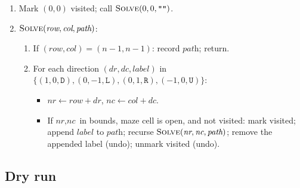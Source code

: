 \begin{enumerate}
  \item Mark $(0,0)$ visited; call $\textsc{Solve}(0,0,\texttt{""})$.
  \item $\textsc{Solve}(\textit{row}, \textit{col}, \textit{path})$:
  \begin{enumerate}
    \item If $(\textit{row},\textit{col}) = (n-1,n-1)$: record
          $\textit{path}$; return.
    \item For each direction $(dr, dc, \textit{label})$ in $\{(1,0,
          \texttt{D}), (0,-1,\texttt{L}), (0,1,\texttt{R}),
          (-1,0,\texttt{U})\}$:
    \begin{itemize}
      \item $\textit{nr} \gets \textit{row}+dr$, $\textit{nc} \gets
            \textit{col}+dc$.
      \item If $\textit{nr},\textit{nc}$ in bounds, maze cell is open,
            and not visited: mark visited; append $\textit{label}$ to
            $\textit{path}$; recurse $\textsc{Solve}(\textit{nr},
            \textit{nc}, \textit{path})$; remove the appended label
            (undo); unmark visited (undo).
    \end{itemize}
  \end{enumerate}
\end{enumerate}

\subsection*{Dry run}


